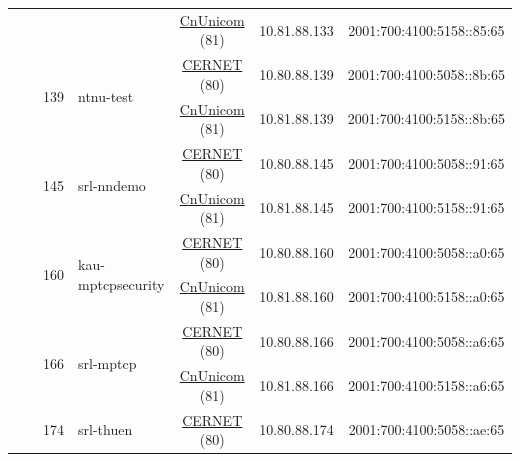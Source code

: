 \begin{small}
\begin{center}
\begin{longtable}{|c|c|c|c|c|c|c|c|}
  &  &  &  & \multicolumn{2}{|c|}{\tiny{\href{http://www.chinaunicom.com}{CnUnicom} (81)}} & \tiny{10.81.88.133} & \tiny{2001:700:4100:5158::85:65} \\* \cline{3-3}\cline{4-4}\cline{5-5}\cline{6-6}\cline{7-7}\cline{8-8}
  &  & \multirow{2}{*}{\tiny{139}} & \multicolumn{1}{|l|}{\multirow{2}{*}{\tiny{ntnu-test}}} & \multicolumn{2}{|c|}{\tiny{\href{http://www.cernet.edu.cn}{CERNET} (80)}} & \tiny{10.80.88.139} & \tiny{2001:700:4100:5058::8b:65} \\* \cline{5-5}\cline{6-6}\cline{7-7}\cline{8-8}
  &  &  &  & \multicolumn{2}{|c|}{\tiny{\href{http://www.chinaunicom.com}{CnUnicom} (81)}} & \tiny{10.81.88.139} & \tiny{2001:700:4100:5158::8b:65} \\* \cline{3-3}\cline{4-4}\cline{5-5}\cline{6-6}\cline{7-7}\cline{8-8}
  &  & \multirow{2}{*}{\tiny{145}} & \multicolumn{1}{|l|}{\multirow{2}{*}{\tiny{srl-nndemo}}} & \multicolumn{2}{|c|}{\tiny{\href{http://www.cernet.edu.cn}{CERNET} (80)}} & \tiny{10.80.88.145} & \tiny{2001:700:4100:5058::91:65} \\* \cline{5-5}\cline{6-6}\cline{7-7}\cline{8-8}
  &  &  &  & \multicolumn{2}{|c|}{\tiny{\href{http://www.chinaunicom.com}{CnUnicom} (81)}} & \tiny{10.81.88.145} & \tiny{2001:700:4100:5158::91:65} \\* \cline{3-3}\cline{4-4}\cline{5-5}\cline{6-6}\cline{7-7}\cline{8-8}
  &  & \multirow{2}{*}{\tiny{160}} & \multicolumn{1}{|l|}{\multirow{2}{*}{\tiny{kau-mptcpsecurity}}} & \multicolumn{2}{|c|}{\tiny{\href{http://www.cernet.edu.cn}{CERNET} (80)}} & \tiny{10.80.88.160} & \tiny{2001:700:4100:5058::a0:65} \\* \cline{5-5}\cline{6-6}\cline{7-7}\cline{8-8}
  &  &  &  & \multicolumn{2}{|c|}{\tiny{\href{http://www.chinaunicom.com}{CnUnicom} (81)}} & \tiny{10.81.88.160} & \tiny{2001:700:4100:5158::a0:65} \\* \cline{3-3}\cline{4-4}\cline{5-5}\cline{6-6}\cline{7-7}\cline{8-8}
  &  & \multirow{2}{*}{\tiny{166}} & \multicolumn{1}{|l|}{\multirow{2}{*}{\tiny{srl-mptcp}}} & \multicolumn{2}{|c|}{\tiny{\href{http://www.cernet.edu.cn}{CERNET} (80)}} & \tiny{10.80.88.166} & \tiny{2001:700:4100:5058::a6:65} \\* \cline{5-5}\cline{6-6}\cline{7-7}\cline{8-8}
  &  &  &  & \multicolumn{2}{|c|}{\tiny{\href{http://www.chinaunicom.com}{CnUnicom} (81)}} & \tiny{10.81.88.166} & \tiny{2001:700:4100:5158::a6:65} \\* \cline{3-3}\cline{4-4}\cline{5-5}\cline{6-6}\cline{7-7}\cline{8-8}
  &  & \multirow{2}{*}{\tiny{174}} & \multicolumn{1}{|l|}{\multirow{2}{*}{\tiny{srl-thuen}}} & \multicolumn{2}{|c|}{\tiny{\href{http://www.cernet.edu.cn}{CERNET} (80)}} & \tiny{10.80.88.174} & \tiny{2001:700:4100:5058::ae:65} \\* \cline{5-5}\cline{6-6}\cline{7-7}\cline{8-8}

\end{longtable}
\end{center}
\end{small}
